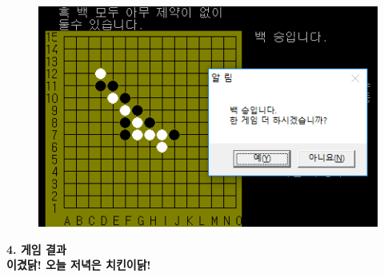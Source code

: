 \documentclass[a4paper, 11pt]{article}
\begin{document}
\begin{figure}[h] %
	\begin{center}
		\includegraphics[width=0.8\linewidth]{4th.png}
	\end{center}
	\label{fig:long}
	\label{fig:onecol}
	
\end{figure}

\begin{center}
	\textbf{{\Large 4. 게임 결과\\}}
	\vspace{0.3cm}
	\textbf{{\normalsize 이겼닭! \tiny 오늘 저녁은 치킨이닭!  \\}}
\end{center}
\end{document}
